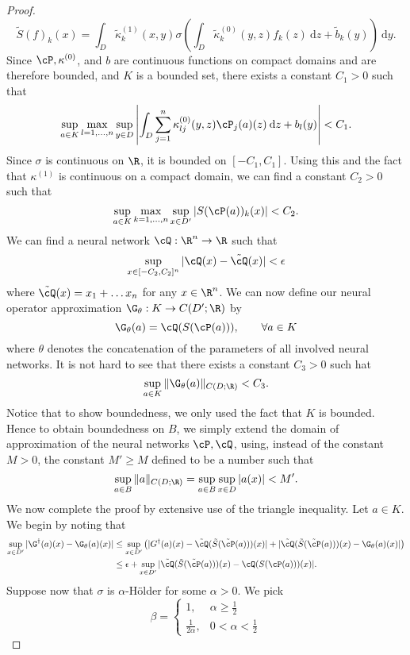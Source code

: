 {\begin{proof}
\[\tilde{S}(f)_k (x) = \int_D \tilde{\kappa}_k^{(1)}(x,y) \sigma \left ( \int_D \tilde{\kappa}^{(0)}_k (y,z) f_k(z) \: \text{d}z + \tilde{b}_k(y) \right ) \: \text{d}y.\]
Since \(\cP, \kappa^{(0)}\), and \(b\) are continuous functions on compact domains and are therefore bounded, and \(K\) is a bounded set, there exists a constant \(C_1 > 0\) such that
\[\sup_{a \in K} \max_{l=1,\dots,n} \sup_{y\in D} \left | \int_D \sum_{j=1}^n \kappa^{(0)}_{lj}(y,z) \cP_j(a) (z) \: \text{d}z + b_l(y) \right | < C_1.\]
Since \(\sigma\) is continuous on \(\R\), it is bounded on \([-C_1,C_1]\). Using this and the fact that \(\kappa^{(1)}\) is continuous on a compact domain, we can find a constant \(C_2 > 0\) such that
\[\sup_{a \in K} \max_{k=1,\dots,n} \sup_{x \in D'} |S(\cP(a))_k(x)| < C_2.\]
We can find a neural network \(\cQ : \R^n \to \R\) such that
\[\sup_{x \in [-C_2,C_2]^n} |\cQ(x) - \tilde{\cQ}(x)| < \epsilon\]
where \(\tilde{\cQ}(x) = x_1 + \dots x_n\) for any \(x \in \R^n\).
We can now define our neural operator approximation \(\G_\theta : K \to C(D';\R)\) by
\[\G_\theta (a) = \cQ(S(\cP(a))), \qquad \forall a \in K\]
where \(\theta\) denotes the concatenation of the parameters of all involved neural networks. It is not hard to see that there exists a constant \(C_3 > 0\) such hat
\[\sup_{a \in K} \|\G_\theta (a)\|_{C(D;\R)} <  C_3.\]
Notice that to show boundedness, we only used the fact that \(K\) is bounded.
Hence to obtain boundedness on \(B\), we simply extend the domain of approximation of the neural networks \(\cP, \cQ\), using, instead of the constant \(M > 0\), the constant \(M' \geq M\) defined to be a number such that
\[\sup_{a \in B} \|a\|_{C(D;\R)} = \sup_{a \in B} \sup_{x \in D} |a(x)| < M'.\]
We now complete the proof by extensive use of the triangle inequality. Let \(a \in K\). We begin by noting that
\begin{align*}
\sup_{x \in D'} |\G^\dagger (a)(x) - \G_\theta(a)(x)| &\leq \sup_{x \in D'} \left ( |G^\dagger(a)(x) - \tilde{\cQ}(\tilde{S}(\tilde{\cP}(a)))(x)| + |\tilde{\cQ}(\tilde{S}(\tilde{\cP}(a)))(x) - \G_\theta(a)(x)|  \right ) \\
&\leq \epsilon + \sup_{x \in D'} |\tilde{\cQ}(\tilde{S}(\tilde{\cP}(a)))(x) - \cQ(S(\cP(a)))(x)|.
\end{align*}
Suppose now that \(\sigma\) is \(\alpha\)-H{\"o}lder for some \(\alpha > 0\). We pick 
\[\beta = \begin{cases} 1, & \alpha \geq \frac{1}{2} \\
\frac{1}{2 \alpha}, & 0 < \alpha < \frac{1}{2}
\end{cases}
\]
\end{proof}}

